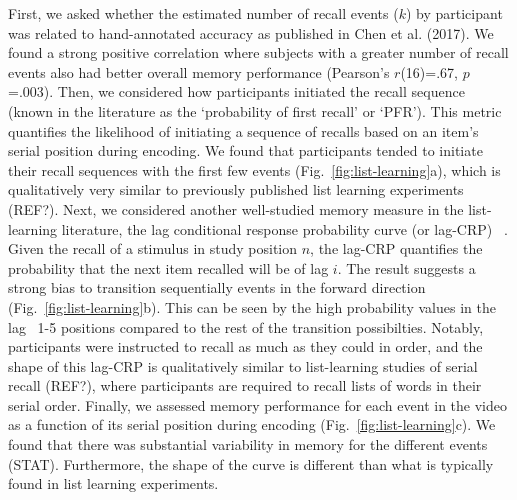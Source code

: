 \documentclass{article}
\begin{document}
{First, we asked whether the estimated number of recall events ($k$) by participant was related to hand-annotated accuracy as published in Chen et al. (2017).  We found a strong positive correlation where subjects with a greater number of recall events also had better overall memory performance (Pearson's $r$(16)=.67, $p$=.003). Then, we considered how participants initiated the recall sequence (known in the literature as the `probability of first recall' or `PFR'). This metric quantifies the likelihood of initiating a sequence of recalls based on an item's serial position during encoding. We found that participants tended to initiate their recall sequences with the first few events (Fig.~\ref{fig:list-learning}a), which is qualitatively very similar to previously published list learning experiments (REF?). Next, we considered another well-studied memory measure in the list-learning literature, the lag conditional response probability curve (or lag-CRP) ~\citep{Kaha96}. Given the recall of a stimulus in study position $n$, the lag-CRP quantifies the probability that the next item recalled will be of lag $i$. The result suggests a strong bias to transition sequentially events in the forward direction (Fig.~\ref{fig:list-learning}b). This can be seen by the high probability values in the lag ~1-5 positions compared to the rest of the transition possibilties. Notably, participants were instructed to recall as much as they could in order, and the shape of this lag-CRP is qualitatively similar to list-learning studies of serial recall (REF?), where participants are required to recall lists of words in their serial order. Finally, we assessed memory performance for each event in the video as a function of its serial position during encoding (Fig.~\ref{fig:list-learning}c). We found that there was substantial variability in memory for the different events (STAT). Furthermore, the shape of the curve is different than what is typically found in list learning experiments.

}
\end{document}
